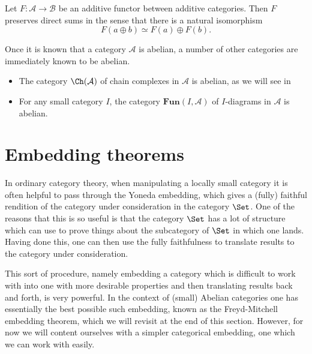 \documentclass[main.tex]{subfiles}
\begin{document}
\begin{corollary}
  Let $F\colon \mathcal{A} \to \mathcal{B}$ be an additive functor between additive categories. Then $F$ preserves direct sums in the sense that there is a natural isomorphism
  \begin{equation*}
    F(a \oplus b) \simeq F(a) \oplus F(b).
  \end{equation*}
\end{corollary}

Once it is known that a category $\mathcal{A}$ is abelian, a number of other categories are immediately known to be abelian.
\begin{itemize}
  \item The category $\Ch(\mathcal{A})$ of chain complexes in $\mathcal{A}$ is abelian, as we will see in

  \item For any small category $I$, the category $\mathbf{Fun}(I, \mathcal{A})$ of $I$-diagrams in $\mathcal{A}$ is abelian.
\end{itemize}

\section{Embedding theorems}
\label{sec:embedding_theorems}

In ordinary category theory, when manipulating a locally small category it is often helpful to pass through the Yoneda embedding, which gives a (fully) faithful rendition of the category under consideration in the category $\Set$. One of the reasons that this is so useful is that the category $\Set$ has a lot of structure which can use to prove things about the subcategory of $\Set$ in which one lands. Having done this, one can then use the fully faithfulness to translate results to the category under consideration.

This sort of procedure, namely embedding a category which is difficult to work with into one with more desirable properties and then translating results back and forth, is very powerful. In the context of (small) Abelian categories one has essentially the best possible such embedding, known as the Freyd-Mitchell embedding theorem, which we will revisit at the end of this section. However, for now we will content ourselves with a simpler categorical embedding, one which we can work with easily.
\end{document}
